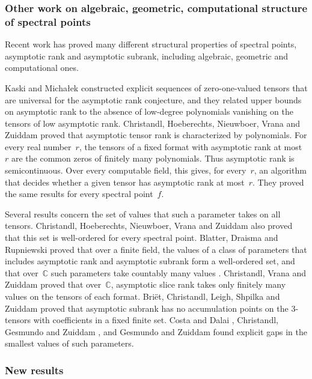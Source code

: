 \documentclass[11pt,letterpaper]{article}
\newcommand{\CC}{\mathbb{C}}
\begin{document}
\FloatBarrier
\subsubsection*{Other work on algebraic, geometric, computational structure of spectral points}

Recent work has proved many different structural properties of spectral points, asymptotic rank and asymptotic subrank, including algebraic, geometric and computational ones. 

Kaski and Micha\l{}ek \cite{kaski2024universalsequencetensorsasymptotic} constructed explicit sequences of zero-one-valued tensors that are universal for the asymptotic rank conjecture, and they related upper bounds on asymptotic rank to the absence of low-degree polynomials vanishing on the tensors of low asymptotic rank. Christandl, Hoeberechts, Nieuwboer, Vrana and Zuiddam \cite{MR4928468} proved that asymptotic tensor rank is characterized by polynomials. For every real number~\(r\), the tensors of a fixed format with asymptotic rank at most~\(r\) are the common zeros of finitely many polynomials. Thus asymptotic rank is semicontinuous. Over every computable field, this gives, for every~\(r\), an algorithm that decides whether a given tensor has asymptotic rank at most~\(r\). They proved the same results for every spectral point~\(f\). 

Several results concern the set of values that such a parameter takes on all tensors. Christandl, Hoeberechts, Nieuwboer, Vrana and Zuiddam \cite{MR4928468} also proved that this set is well-ordered for every spectral point. Blatter, Draisma and Rupniewski \cite{bdr} proved that over a finite field, the values of a class of parameters that includes asymptotic rank and asymptotic subrank form a well-ordered set, and that over~\(\CC\) such parameters take countably many values \cite{https://doi.org/10.48550/arxiv.2212.12219}. Christandl, Vrana and Zuiddam \cite{MR4495838} proved that over~\(\CC\), asymptotic slice rank takes only finitely many values on the tensors of each format. Bri\"et, Christandl, Leigh, Shpilka and Zuiddam \cite{briet_et_al:LIPIcs.ITCS.2024.20} proved that asymptotic subrank has no accumulation points on the \(3\)-tensors with coefficients in a fixed finite set. Costa and Dalai \cite{DBLP:journals/jcta/CostaD21}, Christandl, Gesmundo and Zuiddam \cite{cgz}, and Gesmundo and Zuiddam \cite{gesmundo2023gap} found explicit gaps in the smallest values of such parameters.

\FloatBarrier
\subsubsection*{New results}
\end{document}
